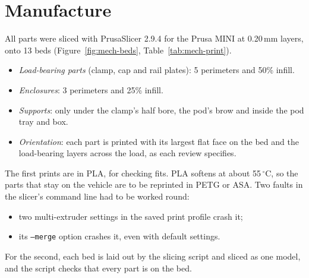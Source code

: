 \section{Manufacture}
\label{sec:mech-print}

All parts were sliced with PrusaSlicer 2.9.4 for the Prusa MINI at 0.20\,mm layers, onto 13 beds (Figure~\ref{fig:mech-beds}, Table~\ref{tab:mech-print}).
\begin{itemize}
\item \emph{Load-bearing parts} (clamp, cap and rail plates): 5 perimeters and 50\% infill.
\item \emph{Enclosures}: 3 perimeters and 25\% infill.
\item \emph{Supports}: only under the clamp's half bore, the pod's brow and inside the pod tray and box.
\item \emph{Orientation}: each part is printed with its largest flat face on the bed and the load-bearing layers across the load, as each review specifies.
\end{itemize}

The first prints are in PLA, for checking fits. PLA softens at about 55\,$^\circ$C, so the parts that stay on the vehicle are to be reprinted in PETG or ASA. Two faults in the slicer's command line had to be worked round:
\begin{itemize}
\item two multi-extruder settings in the saved print profile crash it;
\item its \texttt{--merge} option crashes it, even with default settings.
\end{itemize}

For the second, each bed is laid out by the slicing script and sliced as one model, and the script checks that every part is on the bed.

